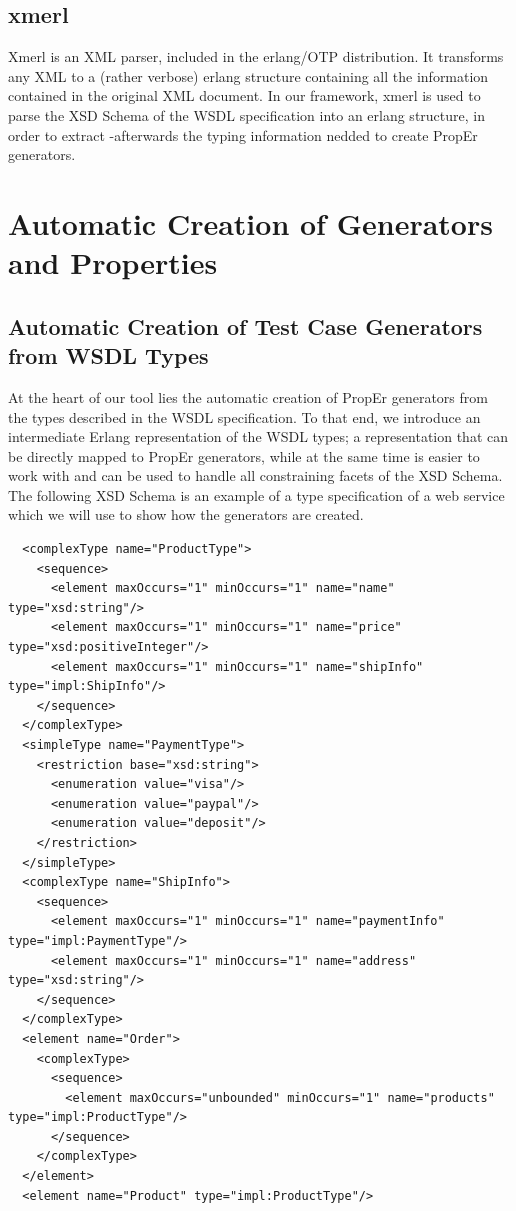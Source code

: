 \documentclass[submission,copyright,a4]{eptcs}
\begin{document}
\subsection{xmerl}

Xmerl is an XML parser, included in the erlang/OTP distribution. It transforms any 
XML to a (rather verbose) erlang structure containing all the information contained 
in the original XML document. In our framework, xmerl is used to parse the XSD 
Schema of the WSDL specification into an erlang structure, in order to extract 
-afterwards the typing information nedded to create PropEr generators.

\section{Automatic Creation of Generators and Properties}

\subsection{Automatic Creation of Test Case Generators from WSDL Types}

At the heart of our tool lies the automatic creation of PropEr generators from 
the types described in the WSDL specification. To that end, we introduce an 
intermediate Erlang representation of the WSDL types; a representation that can 
be directly mapped to PropEr generators, while at the same time is easier to work 
with and can be used to handle all constraining facets of the XSD Schema. The 
following XSD Schema is an example of a type specification of a web service 
which we will use to show how the generators are created.

\begin{lstlisting}
  <complexType name="ProductType">
    <sequence>
      <element maxOccurs="1" minOccurs="1" name="name" type="xsd:string"/>
      <element maxOccurs="1" minOccurs="1" name="price" type="xsd:positiveInteger"/>
      <element maxOccurs="1" minOccurs="1" name="shipInfo" type="impl:ShipInfo"/>
    </sequence>
  </complexType>
  <simpleType name="PaymentType">
    <restriction base="xsd:string">
      <enumeration value="visa"/>
      <enumeration value="paypal"/>
      <enumeration value="deposit"/>
    </restriction>
  </simpleType>
  <complexType name="ShipInfo">
    <sequence>
      <element maxOccurs="1" minOccurs="1" name="paymentInfo" type="impl:PaymentType"/>
      <element maxOccurs="1" minOccurs="1" name="address" type="xsd:string"/>
    </sequence>
  </complexType>
  <element name="Order">
    <complexType>
      <sequence>
        <element maxOccurs="unbounded" minOccurs="1" name="products" type="impl:ProductType"/>
      </sequence>
    </complexType>
  </element>
  <element name="Product" type="impl:ProductType"/>
\end{lstlisting}
\end{document}
